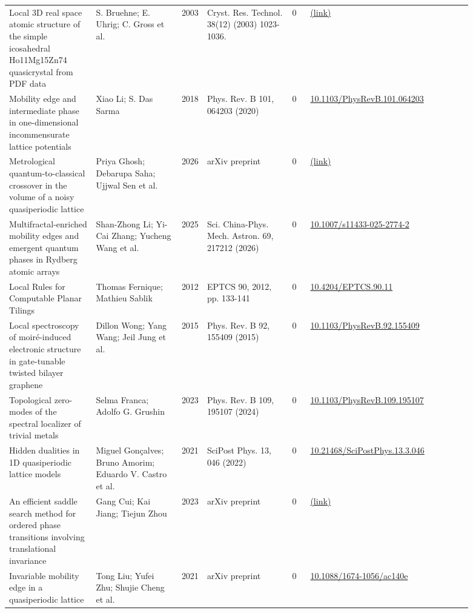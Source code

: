 \documentclass[10pt,a4paper]{article}
\begin{document}
{\begin{longtable}{p{0.192\linewidth}p{0.192\linewidth}p{0.043\linewidth}p{0.192\linewidth}p{0.043\linewidth}p{0.132\linewidth}p{0.096\linewidth}}
Local 3D real space atomic structure of the simple icosahedral Ho11Mg15Zn74 quasicrystal from PDF data & S. Bruehne; E. Uhrig; C. Gross et al. & 2003 & Cryst. Res. Technol. 38(12) (2003) 1023-1036. & 0 & \href{http://arxiv.org/abs/cond-mat/0308161v1}{(link)} &  \\
Mobility edge and intermediate phase in one-dimensional incommensurate lattice potentials & Xiao Li; S. Das Sarma & 2018 & Phys. Rev. B 101, 064203 (2020) & 0 & \href{https://doi.org/10.1103/PhysRevB.101.064203}{10.1103/PhysRevB.101.064203} &  \\
Metrological quantum-to-classical crossover in the volume of a noisy quasiperiodic lattice & Priya Ghosh; Debarupa Saha; Ujjwal Sen et al. & 2026 & arXiv preprint & 0 & \href{http://arxiv.org/abs/2608.30834v1}{(link)} &  \\
Multifractal-enriched mobility edges and emergent quantum phases in Rydberg atomic arrays & Shan-Zhong Li; Yi-Cai Zhang; Yucheng Wang et al. & 2025 & Sci. China-Phys. Mech. Astron. 69, 217212 (2026) & 0 & \href{https://doi.org/10.1007/s11433-025-2774-2}{10.1007/s11433-025-2774-2} &  \\
Local Rules for Computable Planar Tilings & Thomas Fernique; Mathieu Sablik & 2012 & EPTCS 90, 2012, pp. 133-141 & 0 & \href{https://doi.org/10.4204/EPTCS.90.11}{10.4204/EPTCS.90.11} &  \\
Local spectroscopy of moiré-induced electronic structure in gate-tunable twisted bilayer graphene & Dillon Wong; Yang Wang; Jeil Jung et al. & 2015 & Phys. Rev. B 92, 155409 (2015) & 0 & \href{https://doi.org/10.1103/PhysRevB.92.155409}{10.1103/PhysRevB.92.155409} &  \\
Topological zero-modes of the spectral localizer of trivial metals & Selma Franca; Adolfo G. Grushin & 2023 & Phys. Rev. B 109, 195107 (2024) & 0 & \href{https://doi.org/10.1103/PhysRevB.109.195107}{10.1103/PhysRevB.109.195107} &  \\
Hidden dualities in 1D quasiperiodic lattice models & Miguel Gonçalves; Bruno Amorim; Eduardo V. Castro et al. & 2021 & SciPost Phys. 13, 046 (2022) & 0 & \href{https://doi.org/10.21468/SciPostPhys.13.3.046}{10.21468/SciPostPhys.13.3.046} &  \\
An efficient saddle search method for ordered phase transitions involving translational invariance & Gang Cui; Kai Jiang; Tiejun Zhou & 2023 & arXiv preprint & 0 & \href{http://arxiv.org/abs/2310.07108v2}{(link)} &  \\
Invariable mobility edge in a quasiperiodic lattice & Tong Liu; Yufei Zhu; Shujie Cheng et al. & 2021 & arXiv preprint & 0 & \href{https://doi.org/10.1088/1674-1056/ac140e}{10.1088/1674-1056/ac140e} &  \\

\end{longtable}}
\end{document}
